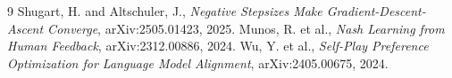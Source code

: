 \documentclass[11pt]{article}
\begin{document}
\begin{thebibliography}{9}
 Shugart, H. and Altschuler, J., \emph{Negative
Stepsizes Make Gradient-Descent-Ascent Converge}, arXiv:2505.01423, 2025.
 Munos, R. et al., \emph{Nash Learning from Human
Feedback}, arXiv:2312.00886, 2024.
 Wu, Y. et al., \emph{Self-Play Preference Optimization for
Language Model Alignment}, arXiv:2405.00675, 2024.
\end{thebibliography}
\end{document}
